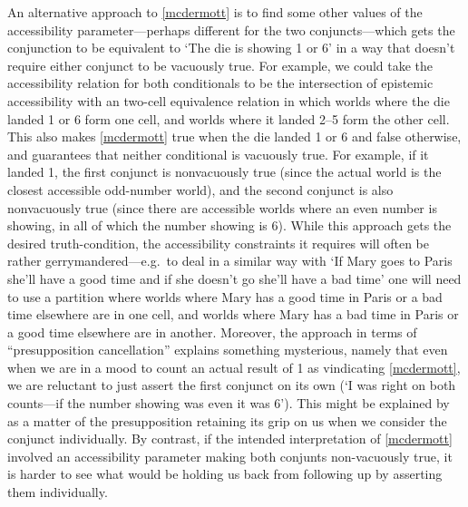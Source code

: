 \documentclass[If.tex]{subfiles}
\begin{document}
An alternative approach to \ref{mcdermott} is to find some other values of the accessibility parameter---perhaps different for the two conjuncts---which gets the conjunction to be equivalent to ‘The die is showing 1 or 6’ in a way that doesn't require either conjunct to be vacuously true.  For example, we could take the accessibility relation for both conditionals to be the intersection of epistemic accessibility with an two-cell equivalence relation in which worlds where the die landed 1 or 6 form one cell, and worlds where it landed 2--5 form the other cell.  This also makes \ref{mcdermott} true when the die landed 1 or 6 and false otherwise, and guarantees that neither conditional is vacuously true.  For example, if it landed 1, the first conjunct is nonvacuously true (since the actual world is the closest accessible odd-number world), and the second conjunct is also nonvacuously true (since there are accessible worlds where an even number is showing, in all of which the number showing is 6).  While this approach gets the desired truth-condition, the accessibility constraints it requires will often be rather gerrymandered---e.g.\ to deal in a similar way with ‘If Mary goes to Paris she'll have a good time and if she doesn't go she'll have a bad time’ one will need to use a partition where worlds where Mary has a good time in Paris or a bad time elsewhere are in one cell, and worlds where Mary has a bad time in Paris or a good time elsewhere are in another.  Moreover, the approach in terms of “presupposition cancellation” explains something mysterious, namely that even when we are in a mood to count an actual result of 1 as vindicating \ref{mcdermott}, we are reluctant to just assert the first conjunct on its own (‘I was right on both counts---if the number showing was even it was 6’).  This might be explained by as a matter of the presupposition retaining its grip on us when we consider the conjunct individually.  By contrast, if the intended interpretation of \ref{mcdermott} involved an accessibility parameter making both conjunts non-vacuously true, it is harder to see what would be holding us back from following up by asserting them individually.  

%
\end{document}
